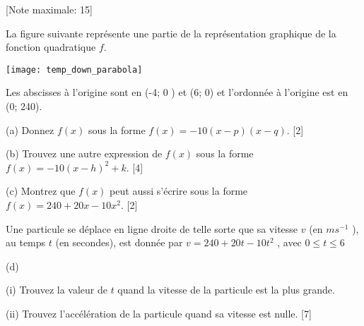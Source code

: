 \begin{question}
  \hspace*{\fill} [Note maximale: 15]\par
  \medskip
  \noindent La figure suivante représente une partie de la représentation graphique de la fonction quadratique $f$.\par
  \medskip
  \begin{center}
    \texttt{[image: temp\_down\_parabola]}\par
  \end{center}
  \medskip
  \noindent Les abscisses à l’origine sont en (-4; 0 ) et (6; 0) et l’ordonnée à l’origine est en (0; 240).\par
  \medskip
  (a) Donnez $f(x)$ sous la forme $f(x) = -10(x - p) (x - q)$.\hspace*{\fill} [2]\par
  \medskip
  (b) Trouvez une autre expression de $f(x)$ sous la forme $f(x) = -10(x - h)^2 + k$.\hspace*{\fill} [4]\par
  \medskip
  (c) Montrez que $f(x)$ peut aussi s’écrire sous la forme $f(x) = 240 + 20x -10x^2$.\hspace*{\fill} [2]\par
  \medskip
  \noindent Une particule se déplace en ligne droite de telle sorte que sa vitesse $v$ (en $ms^{-1}$ ),
au temps $t$ (en secondes), est donnée par $v = 240 + 20t -10t^2$ , avec $0 \le t \le 6$\par
  (d)\par
  \medskip
  \hspace{1em}(i)  Trouvez la valeur de $t$ quand la vitesse de la particule est la plus grande.\par
  \hspace{1em}(ii) Trouvez l’accélération de la particule quand sa vitesse est nulle.\hspace*{\fill} [7]\par
\end{question}



